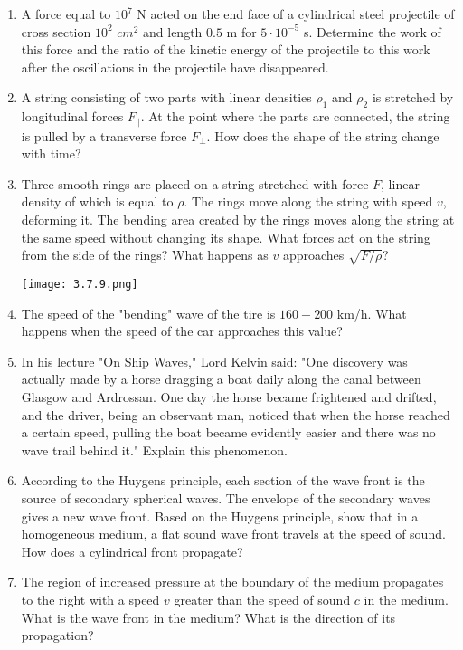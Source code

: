 \documentclass{article}
\begin{document}
\begin{enumerate}[label=3.7.\arabic*]
\item A force equal to $10^7$ N acted on the end face of a cylindrical steel projectile of cross section $10^2$ $cm^2$ and length $0.5$ m for $5 \cdot 10^{-5}$ s. Determine the work of this force and the ratio of the kinetic energy of the projectile to this work after the oscillations in the projectile have disappeared.

\item A string consisting of two parts with linear densities $\rho_1$ and $\rho_2$ is stretched by longitudinal forces $F_{\parallel}$. At the point where the parts are connected, the string is pulled by a transverse force $F_{\bot}$. How does the shape of the string change with time?

\item Three smooth rings are placed on a string stretched with force $F$, linear density of which is equal to $\rho$. The rings move along the string with speed $v$, deforming it. The bending area created by the rings moves along the string at the same speed without changing its shape. What forces act on the string from the side of the rings? What happens as $v$ approaches $\sqrt{F/\rho}$?


\begin{center}
    \texttt{[image: 3.7.9.png]}
\end{center}

\item The speed of the "bending" wave of the tire is $160-200$ km/h. What happens when the speed of the car approaches this value?

\item In his lecture "On Ship Waves," Lord Kelvin said: "One discovery was actually made by a horse dragging a boat daily along the canal between Glasgow and Ardrossan. One day the horse became frightened and drifted, and the driver, being an observant man, noticed that when the horse reached a certain speed, pulling the boat became evidently easier and there was no wave trail behind it." Explain this phenomenon.

\item According to the Huygens principle, each section of the wave front is the source of secondary spherical waves. The envelope of the secondary waves gives a new wave front. Based on the Huygens principle, show that in a homogeneous medium, a flat sound wave front travels at the speed of sound. How does a cylindrical front propagate?

\item The region of increased pressure at the boundary of the medium propagates to the right with a speed $v$ greater than the speed of sound $c$ in the medium. What is the wave front in the medium? What is the direction of its propagation?


\end{enumerate}
\end{document}
